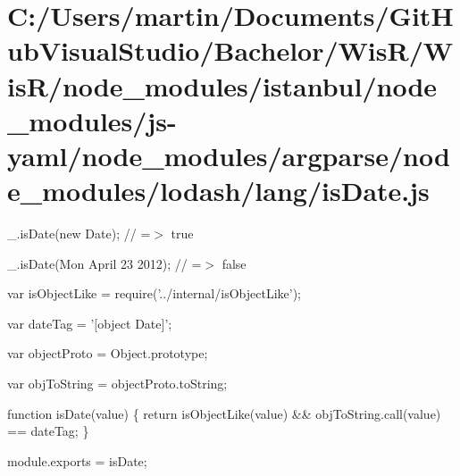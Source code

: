 \hypertarget{_c_1_2_users_2martin_2_documents_2_git_hub_visual_studio_2_bachelor_2_wis_r_2_wis_r_2node_modulefb1760eee96286700e85153db54409df}{}\section{C\+:/\+Users/martin/\+Documents/\+Git\+Hub\+Visual\+Studio/\+Bachelor/\+Wis\+R/\+Wis\+R/node\+\_\+modules/istanbul/node\+\_\+modules/js-\/yaml/node\+\_\+modules/argparse/node\+\_\+modules/lodash/lang/is\+Date.\+js}
\+\_\+.\+is\+Date(new Date); // =$>$ true

\+\_\+.\+is\+Date(\textquotesingle{}Mon April 23 2012\textquotesingle{}); // =$>$ false


\begin{DoxyCodeInclude}
var isObjectLike = require(\textcolor{stringliteral}{'../internal/isObjectLike'});

var dateTag = \textcolor{stringliteral}{'[object Date]'};

var objectProto = Object.prototype;

var objToString = objectProto.toString;

\textcolor{keyword}{function} isDate(value) \{
  \textcolor{keywordflow}{return} isObjectLike(value) && objToString.call(value) == dateTag;
\}

module.exports = isDate;
\end{DoxyCodeInclude}
 